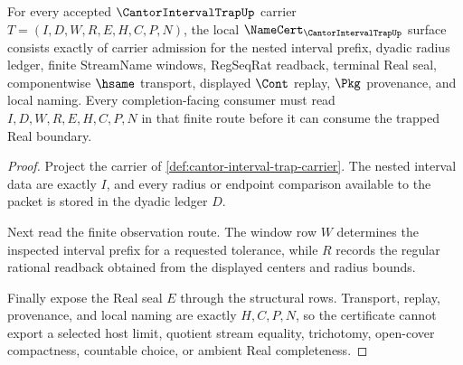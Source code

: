\begin{theorem}
\label{thm:cantor-interval-trap-namecert-obligations}
For every accepted $\CantorIntervalTrapUp$ carrier $T=(I,D,W,R,E,H,C,P,N)$, the local $\NameCert_{\CantorIntervalTrapUp}$ surface consists exactly of carrier admission for the nested interval prefix, dyadic radius ledger, finite StreamName windows, RegSeqRat readback, terminal Real seal, componentwise $\hsame$ transport, displayed $\Cont$ replay, $\Pkg$ provenance, and local naming. Every completion-facing consumer must read $I,D,W,R,E,H,C,P,N$ in that finite route before it can consume the trapped Real boundary.
\end{theorem}
\begin{proof}
Project the carrier of \autoref{def:cantor-interval-trap-carrier}. The nested interval data are exactly $I$, and every radius or endpoint comparison available to the packet is stored in the dyadic ledger $D$.

Next read the finite observation route. The window row $W$ determines the inspected interval prefix for a requested tolerance, while $R$ records the regular rational readback obtained from the displayed centers and radius bounds.

Finally expose the Real seal $E$ through the structural rows. Transport, replay, provenance, and local naming are exactly $H,C,P,N$, so the certificate cannot export a selected host limit, quotient stream equality, trichotomy, open-cover compactness, countable choice, or ambient Real completeness.
\end{proof}

